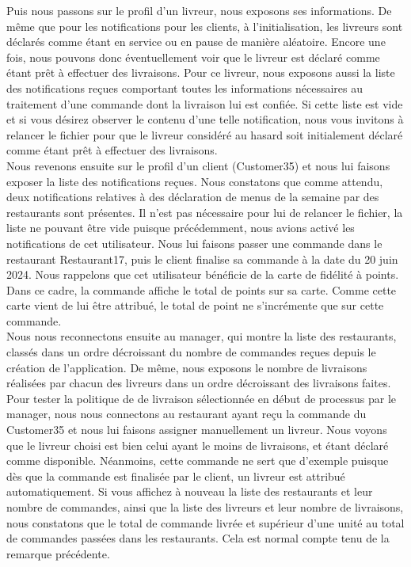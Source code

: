 Puis nous passons sur le profil d'un livreur, nous exposons ses informations. De même que pour les notifications pour les clients, à l'initialisation, les livreurs sont déclarés comme étant en service ou en pause de manière aléatoire. Encore une fois, nous pouvons donc éventuellement voir que le livreur est déclaré comme étant prêt à effectuer des livraisons. Pour ce livreur, nous exposons aussi la liste des notifications reçues comportant toutes les informations nécessaires au traitement d'une commande dont la livraison lui est confiée. Si cette liste est vide et si vous désirez observer le contenu d'une telle notification, nous vous invitons à relancer le fichier pour que le livreur considéré au hasard soit initialement déclaré comme étant prêt à effectuer des livraisons. \\

Nous revenons ensuite sur le profil d'un client (Customer35) et nous lui faisons exposer la liste des notifications reçues. Nous constatons que comme attendu, deux notifications relatives à des déclaration de menus de la semaine par des restaurants sont présentes. Il n'est pas nécessaire pour lui de relancer le fichier, la liste ne pouvant être vide puisque précédemment, nous avions activé les notifications de cet utilisateur. Nous lui faisons passer une commande dans le restaurant Restaurant17, puis le client finalise sa commande à la date du 20 juin 2024. Nous rappelons que cet utilisateur bénéficie de la carte de fidélité à points. Dans ce cadre, la commande affiche le total de points sur sa carte. Comme cette carte vient de lui être attribué, le total de point ne s'incrémente que sur cette commande. \\

Nous nous reconnectons ensuite au manager, qui montre la liste des restaurants, classés dans un ordre décroissant du nombre de commandes reçues depuis le création de l'application. De même, nous exposons le nombre de livraisons réalisées par chacun des livreurs dans un ordre décroissant des livraisons faites. \\

Pour tester la politique de de livraison sélectionnée en début de processus par le manager, nous nous connectons au restaurant ayant reçu la commande du Customer35 et nous lui faisons assigner manuellement un livreur. Nous voyons que le livreur choisi est bien celui ayant le moins de livraisons, et étant déclaré comme disponible. Néanmoins, cette commande ne sert que d'exemple puisque dès que la commande est finalisée par le client, un livreur est attribué automatiquement. Si vous affichez à nouveau la liste des restaurants et leur nombre de commandes, ainsi que la liste des livreurs et leur nombre de livraisons, nous constatons que le total de commande livrée et supérieur d'une unité au total de commandes passées dans les restaurants. Cela est normal compte tenu de la remarque précédente. 

